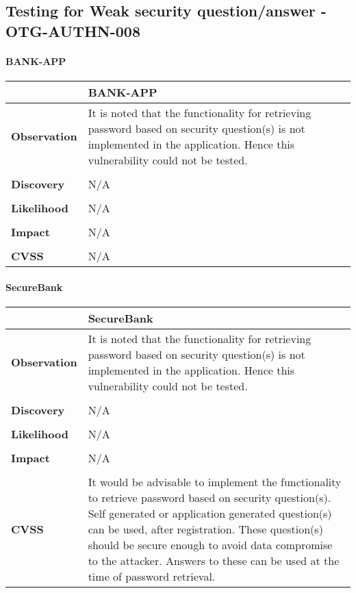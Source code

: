 \subsection{Testing for Weak security question/answer - OTG-AUTHN-008}

\paragraph{BANK-APP} \mbox{}
\begin{longtable*}{p{.20\textwidth} | p{.80\textwidth}}
    \hline
    & \textbf{BANK-APP} \\
    \hline
    \textbf{Observation} &
    It is noted that the functionality for retrieving password based on security question(s) is not implemented in the application. Hence this vulnerability could not be tested.
    \\\\
    \textbf{Discovery} &
      N/A
    \\\\
    \textbf{Likelihood} &
        N/A
    \\\\
    \textbf{Impact} &
       N/A
    \\\\
    \textbf{CVSS} &
     N/A
    \\
    \hline
\end{longtable*}
\paragraph{SecureBank} \mbox{}
\begin{longtable*}{p{.20\textwidth} | p{.80\textwidth}}
    \hline
    & \textbf{SecureBank} \\
    \hline
    \textbf{Observation} &
       It is noted that the functionality for retrieving password based on security question(s) is not implemented in the application. Hence this vulnerability could not be tested.
    \\\\
    \textbf{Discovery} &
    N/A
    \\\\
    \textbf{Likelihood} &
     N/A
    \\\\
    \textbf{Impact} &
      N/A
    \\\\
    \textbf{CVSS} &
    It would be advisable to implement the functionality to retrieve password based on security question(s). Self generated or application generated question(s) can be used, after registration. These question(s) should be secure enough to avoid data compromise to the attacker. Answers to these can be used at the time of password retrieval.
    \\
    \hline
\end{longtable*}
\clearpage